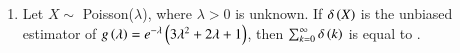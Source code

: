 \documentclass[journal]{IEEEtran}
\begin{document}
\begin{enumerate}
\vspace{0.5cm}

\item Let $X \sim$ Poisson($\lambda$), where $\lambda>0$ is unknown. If $\delta\left(X\right)$ is the unbiased estimator of $g\left(\lambda\right)=e^{-\lambda}\left(3\lambda^2+2\lambda+1\right)$, then $\sum_{k=0}^\infty\delta\left(k\right)$ is equal to \underline{\hspace{2cm}}.
\end{enumerate}
\end{document}
